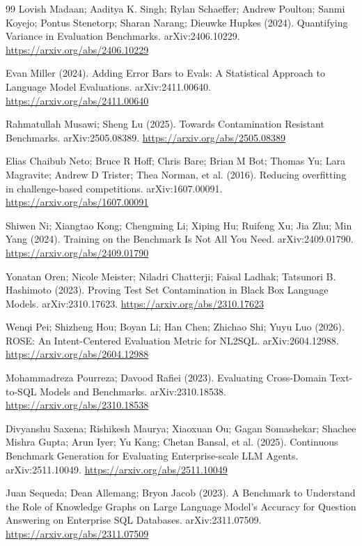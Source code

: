 \begin{thebibliography}{99}
 Lovish Madaan; Aaditya K. Singh; Rylan Schaeffer; Andrew Poulton; Sanmi Koyejo; Pontus Stenetorp; Sharan Narang; Dieuwke Hupkes (2024). Quantifying Variance in Evaluation Benchmarks. arXiv:2406.10229. \url{https://arxiv.org/abs/2406.10229}

 Evan Miller (2024). Adding Error Bars to Evals: A Statistical Approach to Language Model Evaluations. arXiv:2411.00640. \url{https://arxiv.org/abs/2411.00640}

 Rahmatullah Musawi; Sheng Lu (2025). Towards Contamination Resistant Benchmarks. arXiv:2505.08389. \url{https://arxiv.org/abs/2505.08389}

 Elias Chaibub Neto; Bruce R Hoff; Chris Bare; Brian M Bot; Thomas Yu; Lara Magravite; Andrew D Trister; Thea Norman, et al. (2016). Reducing overfitting in challenge-based competitions. arXiv:1607.00091. \url{https://arxiv.org/abs/1607.00091}

 Shiwen Ni; Xiangtao Kong; Chengming Li; Xiping Hu; Ruifeng Xu; Jia Zhu; Min Yang (2024). Training on the Benchmark Is Not All You Need. arXiv:2409.01790. \url{https://arxiv.org/abs/2409.01790}

 Yonatan Oren; Nicole Meister; Niladri Chatterji; Faisal Ladhak; Tatsunori B. Hashimoto (2023). Proving Test Set Contamination in Black Box Language Models. arXiv:2310.17623. \url{https://arxiv.org/abs/2310.17623}

 Wenqi Pei; Shizheng Hou; Boyan Li; Han Chen; Zhichao Shi; Yuyu Luo (2026). ROSE: An Intent-Centered Evaluation Metric for NL2SQL. arXiv:2604.12988. \url{https://arxiv.org/abs/2604.12988}

 Mohammadreza Pourreza; Davood Rafiei (2023). Evaluating Cross-Domain Text-to-SQL Models and Benchmarks. arXiv:2310.18538. \url{https://arxiv.org/abs/2310.18538}

 Divyanshu Saxena; Rishikesh Maurya; Xiaoxuan Ou; Gagan Somashekar; Shachee Mishra Gupta; Arun Iyer; Yu Kang; Chetan Bansal, et al. (2025). Continuous Benchmark Generation for Evaluating Enterprise-scale LLM Agents. arXiv:2511.10049. \url{https://arxiv.org/abs/2511.10049}

 Juan Sequeda; Dean Allemang; Bryon Jacob (2023). A Benchmark to Understand the Role of Knowledge Graphs on Large Language Model's Accuracy for Question Answering on Enterprise SQL Databases. arXiv:2311.07509. \url{https://arxiv.org/abs/2311.07509}


\end{thebibliography}
